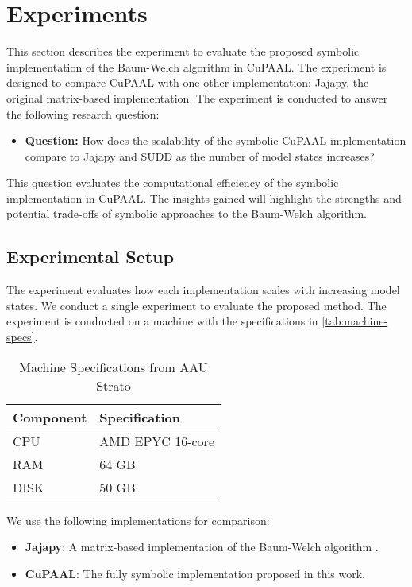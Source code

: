 \section{Experiments}\label{sec:experiments}
This section describes the experiment to evaluate the proposed symbolic implementation of the Baum-Welch algorithm in CuPAAL.
The experiment is designed to compare CuPAAL with one other implementation: Jajapy, the original matrix-based implementation.
The experiment is conducted to answer the following research question:

\begin{itemize}
\item \textbf{Question:} How does the scalability of the symbolic CuPAAL implementation compare to Jajapy and SUDD as the number of model states increases?
\end{itemize}

This question evaluates the computational efficiency of the symbolic implementation in CuPAAL. The insights gained will highlight the strengths and potential trade-offs of symbolic approaches to the Baum-Welch algorithm.

\subsection{Experimental Setup}
The experiment evaluates how each implementation scales with increasing model states. We conduct a single experiment to evaluate the proposed method.
The experiment is conducted on a machine with the specifications in \autoref{tab:machine-specs}. 
\begin{table}
\centering
\caption{Machine Specifications from AAU Strato}
\label{tab:machine-specs}
    \begin{tabular}{ll}
        \toprule
        \textbf{Component} & \textbf{Specification} \\
        \midrule
        CPU & AMD EPYC 16-core \\
        RAM & 64 GB \\
        DISK & 50 GB \\
        \bottomrule
    \end{tabular}
\end{table}

We use the following implementations for comparison:

\begin{itemize}
\item \textbf{Jajapy}: A matrix-based implementation of the Baum-Welch algorithm \cite{reynouard2023jajapy}.
\item \textbf{CuPAAL}: The fully symbolic implementation proposed in this work.
\end{itemize}


